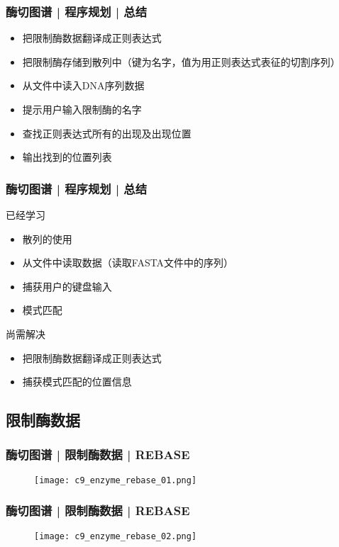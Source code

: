 \begin{frame}
  \frametitle{酶切图谱 | 程序规划 | 总结}
  \begin{itemize}
    \item 把限制酶数据翻译成正则表达式
    \item 把限制酶存储到散列中（键为名字，值为用正则表达式表征的切割序列）
    \item 从文件中读入DNA序列数据
    \item 提示用户输入限制酶的名字
    \item 查找正则表达式所有的出现及出现位置
    \item 输出找到的位置列表
  \end{itemize}
\end{frame}

\begin{frame}
  \frametitle{酶切图谱 | 程序规划 | 总结}
  \begin{block}{已经学习}
    \begin{itemize}
      \item 散列的使用
      \item 从文件中读取数据（读取FASTA文件中的序列）
      \item 捕获用户的键盘输入
      \item 模式匹配
    \end{itemize}
  \end{block}
  \pause
  \begin{block}{尚需解决}
    \begin{itemize}
      \item 把限制酶数据翻译成正则表达式
      \item 捕获模式匹配的位置信息
    \end{itemize}
  \end{block}
\end{frame}

\subsection{限制酶数据}
\begin{frame}
  \frametitle{酶切图谱 | 限制酶数据 | REBASE}
  \begin{figure}
    \centering
    \texttt{[image: c9\_enzyme\_rebase\_01.png]}
  \end{figure}
\end{frame}

\begin{frame}
  \frametitle{酶切图谱 | 限制酶数据 | REBASE}
  \begin{figure}
    \centering
    \texttt{[image: c9\_enzyme\_rebase\_02.png]}
  \end{figure}
\end{frame}


